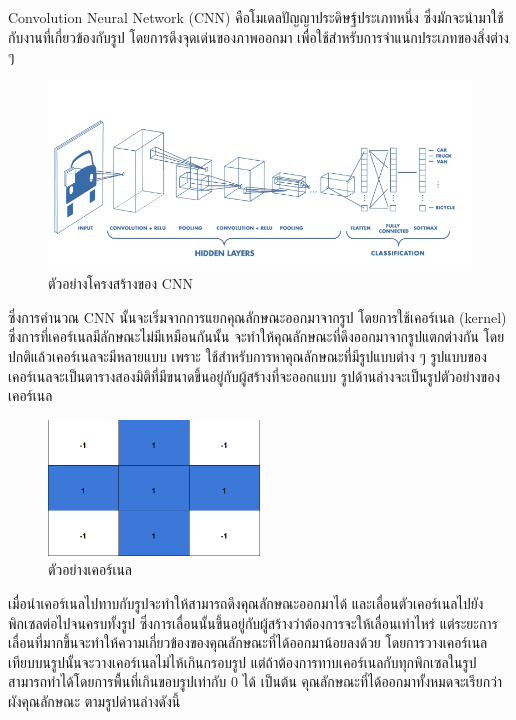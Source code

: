 Convolution Neural Network (CNN) คือโมเดลปัญญาประดิษฐ์ประเภทหนึ่ง ซึ่งมักจะนำมาใช้กับงานที่เกี่ยวข้องกับรูป โดยการดึงจุดเด่นของภาพออกมา เพื่อใช้สำหรับการจำแนกประเภทของสิ่งต่าง ๆ

\begin{figure}[!ht]
	\centering
	\includegraphics[width=1\textwidth]{chapter2/images/CNN.png}
		\caption{ตัวอย่างโครงสร้างของ CNN}
    	\label{fig:CNN architecture}
\end{figure}

ซึ่งการคำนวณ CNN นั้นจะเริ่มจากการแยกคุณลักษณะออกมาจากรูป โดยการใช้เคอร์เนล (kernel) ซึ่งการที่เคอร์เนลมีลักษณะไม่มีเหมือนกันนั้น จะทำให้คุณลักษณะที่ดึงออกมาจากรูปแตกต่างกัน โดยปกติแล้วเคอร์เนลจะมีหลายแบบ เพราะ ใช้สำหรับการหาคุณลักษณะที่มีรูปแบบต่าง ๆ รูปแบบของเคอร์เนลจะเป็นตารางสองมิติที่มีขนาดขึ้นอยู่กับผู้สร้างที่จะออกแบบ รูปด้านล่างจะเป็นรูปตัวอย่างของเคอร์เนล

 \begin{figure}[!ht]
	\centering
	\includegraphics[width=0.5\textwidth]{chapter2/images/kernel_3x3.png}
		\caption{ตัวอย่างเคอร์เนล }
    	\label{fig:CNN architecture}
\end{figure}
\clearpage
เมื่อนำเคอร์เนลไปทาบกับรูปจะทำให้สามารถดึงคุณลักษณะออกมาได้ และเลื่อนตัวเคอร์เนลไปยังพิกเซลต่อไปจนครบทั้งรูป ซึ่งการเลื่อนนั้นขึ้นอยู่กับผู้สร้างว่าต้องการจะให้เลื่อนเท่าไหร่ แต่ระยะการเลื่อนที่มากขึ้นจะทำให้ความเกี่ยวข้องของคุณลักษณะที่ได้ออกมาน้อยลงด้วย โดยการวางเคอร์เนลเทียบบนรูปนั้นจะวางเคอร์เนลไม่ไห้เกินกรอบรูป แต่ถ้าต้องการทาบเคอร์เนลกับทุกพิกเซลในรูป สามารถทำได้โดยการพื้นที่เกินขอบรูปเท่ากับ 0 ได้ เป็นต้น คุณลักษณะที่ได้ออกมาทั้งหมดจะเรียกว่าผังคุณลักษณะ ตามรูปด่านล่างดังนี้


